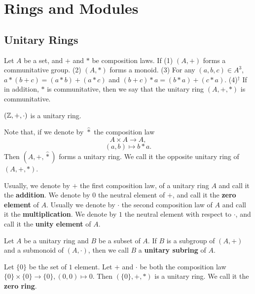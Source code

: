 \documentclass{book}
\numberwithin{equation}{section}
\begin{document}
\chapter{Rings and Modules}
\section{Unitary Rings}
\begin{definitionenv}
    Let $A$ be a set,  and $+$ and $*$ be composition laws. If 
    \newline
    (1) $(A, +)$ forms a communitative group.
    \newline
    (2) $(A, *)$ forms a monoid.
    \newline
    (3) For any $(a, b, c)\in A^3$,  $a*(b+c)=(a*b)+(a*c)$ and $(b+c)*a=(b*a)+(c*a)$.
    \newline
    (4)$^\dagger$ If in addition,  $*$ is communitative,  then we say that the unitary ring $(A, +, *)$ is communitative.
\end{definitionenv}
\begin{exampleenv}
    $(\mathbb{Z}, +, \cdot)$ is a unitary ring.
\end{exampleenv}
Note that,  if we denote by $\hat{*}$ the composition law 
$$A\times A\longrightarrow A, $$
$$(a, b)\longmapsto b*a.$$
Then $(A, +, \hat{*})$ forms a unitary ring. We call it the opposite unitary ring of $(A, +, *)$.
\begin{notationenv}
    Usually,  we denote by $+$ the first composition law,  of a unitary ring $A$ and call it the \textbf{addition}. We denote by $0$ the neutral element of $+$,  and call it the \textbf{zero element} of $A$. Usually we denote by $\cdot$ the second composition law of $A$ and call it the \textbf{multiplication}. We denote by $1$ the neutral element with respect to $\cdot$,  and call it the \textbf{unity element} of $A$.
\end{notationenv}
\begin{definitionenv}
    Let $A$ be a unitary ring and $B$ be a subset of $A$. If $B$ is a subgroup of $(A, +)$ and a submonoid of $(A, \cdot)$,  then we call $B$ a \textbf{unitary subring} of $A$.
\end{definitionenv}
\begin{exampleenv}
    Let $\{0\}$ be the set of $1$ element. Let $+$ and $\cdot$ be both the composition law $\{0\}\times\{0\}\rightarrow\{0\}, (0, 0)\mapsto0$. Then $(\{0\}, +, *)$ is a unitary ring. We call it the \textbf{zero ring}.
\end{exampleenv}
\end{document}
